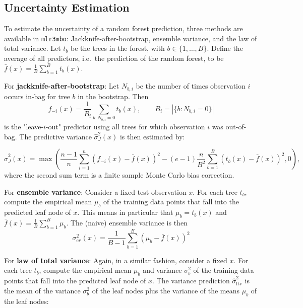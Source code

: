 \subsection*{Uncertainty Estimation}
\label{sec:uncertainty-estimation}

To estimate the uncertainty of a random forest prediction, three methods are available in \texttt{mlr3mbo}: Jackknife-after-bootstrap, ensemble variance, and the law of total variance.
Let $t_b$ be the trees in the forest, with $b \in \{1, \ldots, B\}$. 
Define the average of all predictors, i.e.\ the prediction of the random forest, to be $\bar{f}(x) = \frac{1}{B} \sum_{b=1}^B t_b(x)$. 

For \textbf{jackknife-after-bootstrap}\cite{wager2014}:
Let $N_{b,i}$ be the number of times observation $i$ occurs in-bag for tree $b$ in the bootstrap.
Then 
\begin{displaymath}
f_{-i}(x) = \frac{1}{B_i} \sum_{b: N_{b,i} = 0} t_b(x),  \qquad B_i = \left|\{b: N_{b,i} = 0\}\right|
\end{displaymath}
is the "leave-$i$-out" predictor using all trees for which observation $i$ was out-of-bag.
The predictive variance $\widehat{\sigma}^2_J(x)$ is then estimated by:

\begin{displaymath}
\widehat{\sigma}^2_J(x) = \max\left(\frac{n - 1}{n} \sum_{i=1}^{n} \left( f_{-i}(x) -  \bar{f}(x) \right)^2 - (e - 1)\frac{n}{B^2}\sum_{b=1}^{B}\left(t_b(x)-\bar{f}(x)\right)^2, 0\right)\textrm{,}
\end{displaymath}
where the second sum term is a finite sample Monte Carlo bias correction.


For \textbf{ensemble variance}\cite{hutter2014}:
Consider a fixed test observation $x$.
For each tree $t_b$, compute the empirical mean $\mu_b$ of the training data points that fall into the predicted leaf node of $x$.
This means in particular that $\mu_b=t_b(x)$ and $\bar{f}(x)=\frac{1}{B}\sum_{b=1}^{B}\mu_b$.
The (naive) ensemble variance is then
\begin{displaymath}
  \sigma_{\mathrm{ev}}^2(x)=\frac{1}{B-1}\sum_{b=1}^{B}\left(\mu_b-\bar{f}(x)\right)^2
\end{displaymath}

For \textbf{law of total variance}\cite{hutter2014}: Again, in a similar fashion, consider a fixed $x$.
For each tree $t_b$, compute the empirical mean $\mu_b$ and variance $\sigma_b^2$ of the training data points that fall into the predicted leaf node of $x$.
The variance prediction $\hat{\sigma}_{\mathrm{ltv}}^2$ is the mean of the variance $\sigma_b^2$ of the leaf nodes plus the variance of the means $\mu_b$ of the leaf nodes:

